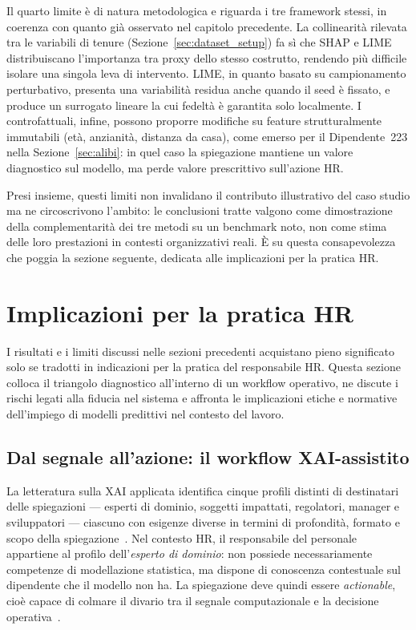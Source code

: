 Il quarto limite è di natura metodologica e riguarda i tre framework stessi, in coerenza con quanto già osservato nel capitolo precedente. La collinearità rilevata tra le variabili di tenure (Sezione~\ref{sec:dataset_setup}) fa sì che SHAP e LIME distribuiscano l'importanza tra proxy dello stesso costrutto, rendendo più difficile isolare una singola leva di intervento. LIME, in quanto basato su campionamento perturbativo, presenta una variabilità residua anche quando il seed è fissato, e produce un surrogato lineare la cui fedeltà è garantita solo localmente. I controfattuali, infine, possono proporre modifiche su feature strutturalmente immutabili (età, anzianità, distanza da casa), come emerso per il Dipendente~223 nella Sezione~\ref{sec:alibi}: in quel caso la spiegazione mantiene un valore diagnostico sul modello, ma perde valore prescrittivo sull'azione HR.

Presi insieme, questi limiti non invalidano il contributo illustrativo del caso studio ma ne circoscrivono l'ambito: le conclusioni tratte valgono come dimostrazione della complementarità dei tre metodi su un benchmark noto, non come stima delle loro prestazioni in contesti organizzativi reali. È su questa consapevolezza che poggia la sezione seguente, dedicata alle implicazioni per la pratica HR.

\section{Implicazioni per la pratica HR}
\label{sec:discussione_implicazioni}

I risultati e i limiti discussi nelle sezioni precedenti acquistano pieno significato solo se tradotti in indicazioni per la pratica del responsabile HR. Questa sezione colloca il triangolo diagnostico all'interno di un workflow operativo, ne discute i rischi legati alla fiducia nel sistema e affronta le implicazioni etiche e normative dell'impiego di modelli predittivi nel contesto del lavoro.

\subsection{Dal segnale all'azione: il workflow XAI-assistito}

La letteratura sulla XAI applicata identifica cinque profili distinti di destinatari delle spiegazioni --- esperti di dominio, soggetti impattati, regolatori, manager e sviluppatori --- ciascuno con esigenze diverse in termini di profondità, formato e scopo della spiegazione~\cite{arrieta2020explainable}. Nel contesto HR, il responsabile del personale appartiene al profilo dell'\emph{esperto di dominio}: non possiede necessariamente competenze di modellazione statistica, ma dispone di conoscenza contestuale sul dipendente che il modello non ha. La spiegazione deve quindi essere \emph{actionable}, cioè capace di colmare il divario tra il segnale computazionale e la decisione operativa~\cite{arrieta2020explainable}.

